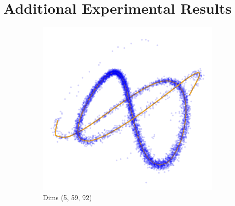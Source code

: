 \FloatBarrier


\section{Additional Experimental Results}\label{app:experimental-results}


\begin{figure}[htbp]
    \centering

    \begin{subfigure}[t]{0.30\textwidth}
        \includegraphics[width=\textwidth]{Chapter5/results/visualisations/RAE/projections/sinusoid_1_100/more_transparent/5_59_92.jpg}
        \caption{Dims (5, 59, 92)}
    \end{subfigure}
    \hfill
    \begin{subfigure}[t]{0.30\textwidth}

\end{subfigure}
\end{figure}
